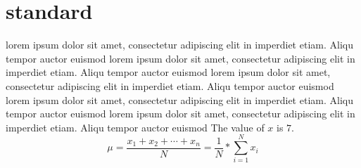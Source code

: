 \section{standard}
lorem ipsum dolor sit amet, consectetur adipiscing elit in imperdiet etiam. Aliqu tempor auctor euismod
lorem ipsum dolor sit amet, consectetur adipiscing elit in imperdiet etiam. Aliqu tempor auctor euismod
lorem ipsum dolor sit amet, consectetur adipiscing elit in imperdiet etiam. Aliqu tempor auctor euismod
lorem ipsum dolor sit amet, consectetur adipiscing elit in imperdiet etiam. Aliqu tempor auctor euismod
lorem ipsum dolor sit amet, consectetur adipiscing elit in imperdiet etiam. Aliqu tempor auctor euismod
The value of $x$ is $7$.
\begin{equation}
    \mu = \frac{x_{1} + x_{2} + \cdots + x_{n}}{N} = \frac{1}{N} * \sum_{i=1}^{N} x_{i}
\end{equation}